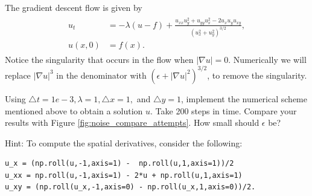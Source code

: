 The gradient descent flow is given by
\begin{align}
	\begin{split}
u_t &= -\lambda (u-f) + \frac{u_{xx}u_y^2 + u_{yy}u_x^2 - 2u_xu_yu_{xy}}{(u_x^2 + u_y^2)^{3/2}} ,\\
u(x,0) &= f(x).
\end{split} \label{tv_images:tv_flow}
\end{align}
Notice the singularity that occurs in the flow when $|\nabla u| = 0$. Numerically we will replace  $|\nabla u|^{3}$ in the denominator with $(\epsilon + |\nabla u|^{2})^{3/2}$, to remove the singularity.


\begin{problem}
Using $\triangle t = 1e-3, \lambda = 1, \triangle x = 1,$ and $ \triangle y = 1$, implement the numerical scheme mentioned above to obtain a solution $u$.  Take 200 steps in time. Compare your results with Figure \ref{fig:noise_compare_attempts}. How small should $\epsilon$ be? 

Hint: To compute the spatial derivatives, consider the following: 
\begin{lstlisting}
u_x = (np.roll(u,-1,axis=1) -  np.roll(u,1,axis=1))/2	
u_xx = np.roll(u,-1,axis=1) - 2*u + np.roll(u,1,axis=1)	
u_xy = (np.roll(u_x,-1,axis=0) - np.roll(u_x,1,axis=0))/2.
\end{lstlisting}
\end{problem}


